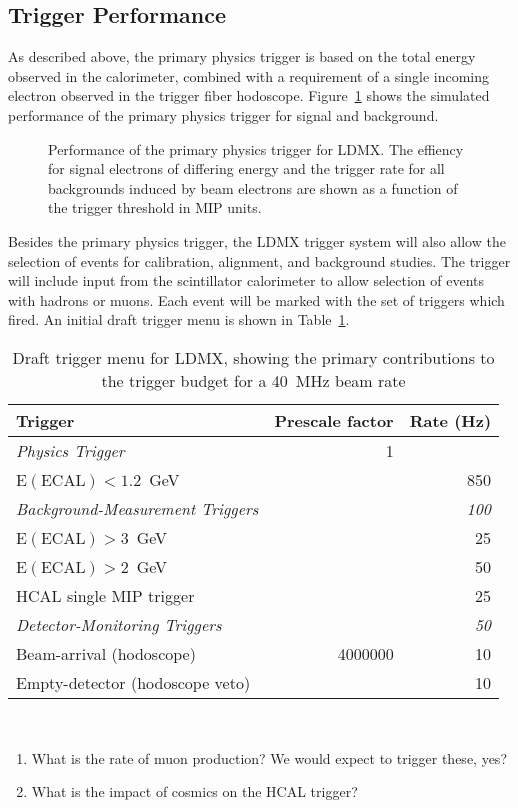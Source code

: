 
\subsection{Trigger Performance}

As described above, the primary physics trigger is based on the total energy observed in the calorimeter, combined with a requirement of a single incoming electron observed in the trigger fiber hodoscope.
Figure~\ref{fig:trigger_rejection} shows the simulated performance of
the primary physics trigger for signal and background.

\begin{figure}[t]
  \caption{Performance of the primary physics trigger for LDMX.  The
    effiency for signal electrons of differing energy and the trigger
    rate for all backgrounds induced by beam electrons are shown as a
    function of the trigger threshold in MIP
    units.}\label{fig:trigger_rejection}
\end{figure}

Besides the primary physics trigger, the LDMX trigger system will also
allow the selection of events for calibration, alignment, and
background studies.  The trigger will include input from the
scintillator calorimeter to allow selection of events with hadrons or
muons.  Each event will be marked with the set of triggers which
fired.  An initial draft trigger menu is shown in Table~\ref{tab:trigger_menu}.

\begin{table}
  \caption{Draft trigger menu for LDMX, showing the primary
    contributions to the trigger budget for a 40~MHz beam
    rate}\label{tab:trigger_menu}
  \begin{tabular}{|l|r|r|} \hline
    Trigger & Prescale factor & Rate (Hz) \\
    \hline
    \em{Physics Trigger} & 1 & \\ 
    \hspace{0.2in} $\mathrm{E(ECAL)}<1.2$~GeV & & 850 \\ \hline
    \em{Background-Measurement Triggers} &  & \em{100} \\
    \hspace{0.2in} $\mathrm{E(ECAL)}>3$~GeV & & 25 \\
    \hspace{0.2in} $\mathrm{E(ECAL)}>2$~GeV & & 50 \\
    \hspace{0.2in} HCAL single MIP trigger & & 25 \\ \hline
    \em{Detector-Monitoring Triggers} &  & \em{50} \\
    \hspace{0.2in} Beam-arrival (hodoscope) & 4000000 & 10 \\
    \hspace{0.2in} Empty-detector (hodoscope veto) & & 10 \\
    \hline
  \end{tabular}
  \\
\end{table}


\begin{enumerate}
\item What is the rate of muon production?  We would expect to trigger these, yes?
\item What is the impact of cosmics on the HCAL trigger?
\end{enumerate}
